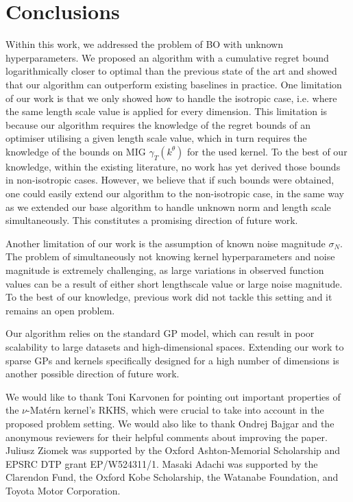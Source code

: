 \documentclass{article}
\theoremstyle{plain}
\theoremstyle{definition}
\theoremstyle{remark}
\theoremstyle{plain}
\begin{document}
\section{Conclusions}
Within this work, we addressed the problem of BO with unknown hyperparameters. We proposed an algorithm with a cumulative regret bound logarithmically closer to optimal than the previous state of the art and showed that our algorithm can outperform existing baselines in practice. One limitation of our work is that we only showed how to handle the isotropic case, i.e. where the same length scale value is applied for every dimension. This limitation is because our algorithm requires the knowledge of the regret bounds of an optimiser utilising a given length scale value, which in turn requires the knowledge of the bounds on MIG $\gamma_T(k^\theta)$ for the used kernel. To the best of our knowledge, within the existing literature, no work has yet derived those bounds in non-isotropic cases. However, we believe that if such bounds were obtained, one could easily extend our algorithm to the non-isotropic case, in the same way as 
we extended our base algorithm to handle unknown norm and length scale simultaneously. This constitutes a promising direction of future work. 

Another limitation of our work is the assumption of known noise magnitude $\sigma_N$. The problem of simultaneously not knowing kernel hyperparameters and noise magnitude is extremely challenging, as large variations in observed function values can be a result of either short lengthscale value or large noise magnitude. To the best of our knowledge, previous work did not tackle this setting and it remains an open problem.

Our algorithm relies on the standard GP model, which can result in poor scalability to large datasets and high-dimensional spaces. Extending our work to sparse GPs \cite{mcintire2016sparse, moss2023inducing} and kernels specifically designed for a high number of dimensions \cite{eriksson2021high,ziomek2023random} is another possible direction of future work. 

\begin{ack}
We would like to thank Toni Karvonen for pointing out important properties of the $\nu$-Matérn kernel's RKHS, which were crucial to take into account in the proposed problem setting. We would also like to thank Ondrej Bajgar and the anonymous reviewers for their helpful comments about improving the paper. Juliusz Ziomek was supported by the Oxford Ashton-Memorial Scholarship and EPSRC DTP grant EP/W524311/1.
Masaki Adachi was supported by the Clarendon Fund, the Oxford Kobe Scholarship, the Watanabe Foundation, and Toyota Motor Corporation.
\end{ack}
\end{document}

